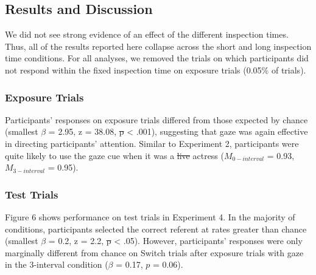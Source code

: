 \documentclass[authoryear, review]{elsarticle}
\providecommand{\DIFaddtex}[1]{{\protect\color{blue}\uwave{#1}}} %
\providecommand{\DIFdeltex}[1]{{\protect\color{red}\sout{#1}}}                      %
\providecommand{\DIFaddbegin}{} %
\providecommand{\DIFaddend}{} %
\providecommand{\DIFdelbegin}{} %
\providecommand{\DIFdelend}{} %
\providecommand{\DIFadd}[1]{\texorpdfstring{\DIFaddtex{#1}}{#1}} %
\providecommand{\DIFdel}[1]{\texorpdfstring{\DIFdeltex{#1}}{}} %
\begin{document}
\subsection{Results and Discussion}\label{results-and-discussion-3}

We did not see strong evidence of an effect of the different inspection
times. Thus, all of the results reported here collapse across the short
and long inspection time conditions. For all analyses, we removed the
trials on which participants did not respond within the fixed inspection
time on exposure trials (0.05\% of trials).

\subsubsection{Exposure Trials}\label{exposure-trials-3}

Participants' responses on exposure trials differed from those expected
by chance (smallest \(\beta\) = 2.95, z = 38.08, \DIFdelbegin \DIFdel{p }\DIFdelend \DIFaddbegin \DIFadd{\(p\) }\DIFaddend \textless{}
.001), suggesting that gaze was again effective in directing
participants' attention. Similar to Experiment 2, participants were
quite likely to use the gaze cue when it was a \DIFdelbegin \DIFdel{live }\DIFdelend \DIFaddbegin \DIFadd{video of an }\DIFaddend actress
(\(M_{0-interval}\) = 0.93, \(M_{3-interval}\) = 0.95).

\subsubsection{Test Trials}\label{test-trials-3}

Figure 6 shows performance on test trials in Experiment 4. In the
majority of conditions, participants selected the correct referent at
rates greater than chance (smallest \(\beta\) = 0.2, z = 2.2, \DIFdelbegin \DIFdel{p
}\DIFdelend \DIFaddbegin \DIFadd{\(p\)
}\DIFaddend \textless{} .05). However, participants' responses were only marginally
different from chance on Switch trials after exposure trials with gaze
in the 3-interval condition (\(\beta\) = 0.17, \(p\) = 0.06).
\end{document}

